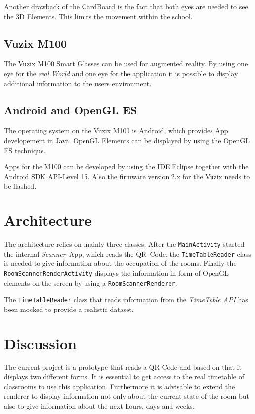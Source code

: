 \documentclass[11pt]{scrartcl}
\begin{document}
\begin{multicols}{2}
			Another drawback of the CardBoard is the fact that both eyes are needed to see the 3D Elements. This limits the movement within the school.   
		
		\subsection{Vuzix M100}
			The Vuzix M100 Smart Glasses can be used for augmented reality. By using one eye for the \emph{real World} and one eye for the application it is possible to display additional information to the users environment.
		
		\subsection{Android and OpenGL ES}
			The operating system on the Vuzix M100 is Android, which provides App developement in Java. OpenGL Elements can be displayed by using the OpenGL ES technique.
	
			Apps for the M100 can be developed by using the IDE Eclipse together with the Android SDK API-Level 15. Also the firmware version 2.x for the Vuzix needs to be flashed.

	\section{Architecture}
		The architecture relies on mainly three classes. After the \texttt{MainActivity} started the internal \emph{Scanner}--App, which reads the QR--Code, the \texttt{TimeTableReader} class is needed to give information about the occupation of the rooms. Finally the \texttt{RoomScannerRenderActivity} displays the information in form of OpenGL elements on the screen by using a \texttt{RoomScannerRenderer}.
		
		The \texttt{TimeTableReader} class that reads information from the \emph{TimeTable API} has been mocked to provide a realistic dataset.
		
	\section{Discussion}
		The current project is a prototype that reads a QR-Code and based on that it displays two different forms. It is essential to get access to the real timetable of classrooms to use this application. Furthermore it is advisable to extend the renderer to display information not only about the current state of the room but also to give information about the next hours, days and weeks.
		

\end{multicols}
\end{document}
